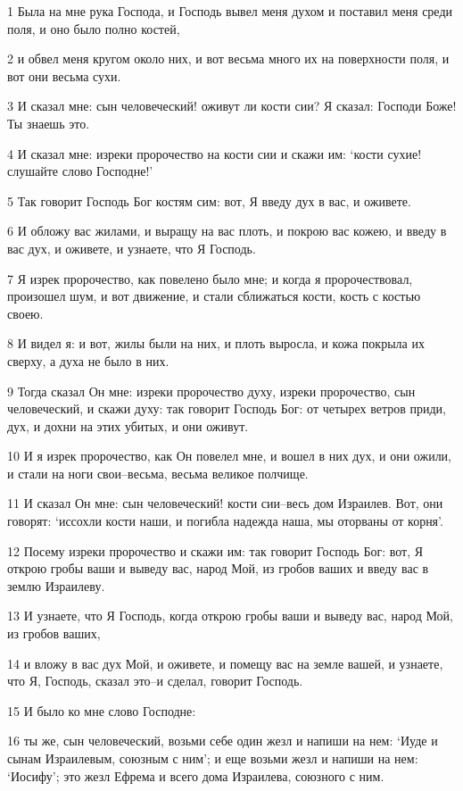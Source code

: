 \par 1 Была на мне рука Господа, и Господь вывел меня духом и поставил меня среди поля, и оно было полно костей,
\par 2 и обвел меня кругом около них, и вот весьма много их на поверхности поля, и вот они весьма сухи.
\par 3 И сказал мне: сын человеческий! оживут ли кости сии? Я сказал: Господи Боже! Ты знаешь это.
\par 4 И сказал мне: изреки пророчество на кости сии и скажи им: `кости сухие! слушайте слово Господне!'
\par 5 Так говорит Господь Бог костям сим: вот, Я введу дух в вас, и оживете.
\par 6 И обложу вас жилами, и выращу на вас плоть, и покрою вас кожею, и введу в вас дух, и оживете, и узнаете, что Я Господь.
\par 7 Я изрек пророчество, как повелено было мне; и когда я пророчествовал, произошел шум, и вот движение, и стали сближаться кости, кость с костью своею.
\par 8 И видел я: и вот, жилы были на них, и плоть выросла, и кожа покрыла их сверху, а духа не было в них.
\par 9 Тогда сказал Он мне: изреки пророчество духу, изреки пророчество, сын человеческий, и скажи духу: так говорит Господь Бог: от четырех ветров приди, дух, и дохни на этих убитых, и они оживут.
\par 10 И я изрек пророчество, как Он повелел мне, и вошел в них дух, и они ожили, и стали на ноги свои--весьма, весьма великое полчище.
\par 11 И сказал Он мне: сын человеческий! кости сии--весь дом Израилев. Вот, они говорят: `иссохли кости наши, и погибла надежда наша, мы оторваны от корня'.
\par 12 Посему изреки пророчество и скажи им: так говорит Господь Бог: вот, Я открою гробы ваши и выведу вас, народ Мой, из гробов ваших и введу вас в землю Израилеву.
\par 13 И узнаете, что Я Господь, когда открою гробы ваши и выведу вас, народ Мой, из гробов ваших,
\par 14 и вложу в вас дух Мой, и оживете, и помещу вас на земле вашей, и узнаете, что Я, Господь, сказал это--и сделал, говорит Господь.
\par 15 И было ко мне слово Господне:
\par 16 ты же, сын человеческий, возьми себе один жезл и напиши на нем: `Иуде и сынам Израилевым, союзным с ним'; и еще возьми жезл и напиши на нем: `Иосифу'; это жезл Ефрема и всего дома Израилева, союзного с ним.
